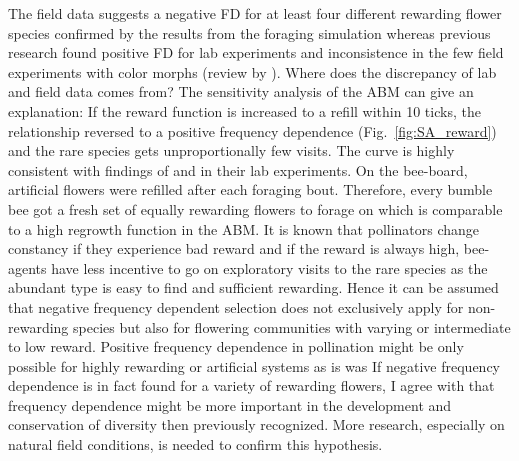The field data suggests a negative FD for at least four different rewarding flower species confirmed by the results from the foraging simulation whereas previous research found positive FD for lab experiments and inconsistence in the few field experiments with color morphs (review by \citealt{smithson2001pollinator}). Where does the discrepancy of lab and field data comes from? 
The sensitivity analysis of the ABM can give an explanation: If the reward function is increased to a refill within 10 ticks, the relationship reversed to a positive frequency dependence (Fig.~\ref{fig:SA_reward}) and the rare species gets unproportionally few visits. The curve is  highly consistent with findings of  \cite{smithson1997density} and \cite{smithson1996frequency} in their lab experiments. On the bee-board, artificial flowers were refilled after each foraging bout. Therefore, every bumble bee got a fresh set of equally rewarding flowers to forage on which is comparable to a high regrowth function in the ABM.
 It is known that pollinators change constancy if they experience bad reward \citep{chittka1997foraging} and if the reward is always high, bee-agents have less incentive to go on exploratory visits to the rare species as the abundant type is easy to find and sufficient rewarding. 
Hence it can be assumed that negative frequency dependent selection does not exclusively apply for non-rewarding species but also for flowering communities with varying or intermediate to low reward. Positive frequency dependence in pollination might be only possible for highly rewarding or artificial systems as is was  If negative frequency dependence is in fact found for a variety of rewarding flowers, I agree with \cite{Eckhart2006frequency} that frequency dependence might be more important in the development and conservation of diversity then previously recognized. More research, especially on natural field conditions, is needed to confirm this hypothesis.



